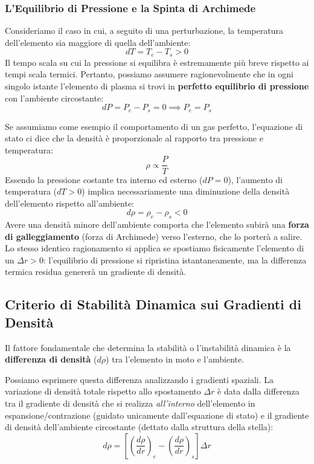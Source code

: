 \subsubsection{L'Equilibrio di Pressione e la Spinta di Archimede}
Consideriamo il caso in cui, a seguito di una perturbazione, la temperatura dell'elemento sia maggiore di quella dell'ambiente:
\begin{equation}
dT = T_e - T_s > 0
\end{equation}
Il tempo scala su cui la pressione si equilibra è estremamente più breve rispetto ai tempi scala termici. Pertanto, possiamo assumere ragionevolmente che in ogni singolo istante l'elemento di plasma si trovi in \textbf{perfetto equilibrio di pressione} con l'ambiente circostante:
\begin{equation}
dP = P_e - P_s = 0 \implies P_e = P_s
\end{equation}

Se assumiamo come esempio il comportamento di un gas perfetto, l'equazione di stato ci dice che la densità è proporzionale al rapporto tra pressione e temperatura:
\begin{equation}
\rho \propto \frac{P}{T}
\end{equation}
Essendo la pressione costante tra interno ed esterno ($dP = 0$), l'aumento di temperatura ($dT > 0$) implica necessariamente una diminuzione della densità dell'elemento rispetto all'ambiente:
\begin{equation}
d\rho = \rho_e - \rho_s < 0
\end{equation}
Avere una densità minore dell'ambiente comporta che l'elemento subirà una \textbf{forza di galleggiamento} (forza di Archimede) verso l'esterno, che lo porterà a salire. Lo stesso identico ragionamento si applica se spostiamo fisicamente l'elemento di un $\Delta r > 0$: l'equilibrio di pressione si ripristina istantaneamente, ma la differenza termica residua genererà un gradiente di densità.

\subsection{Criterio di Stabilità Dinamica sui Gradienti di Densità}

Il fattore fondamentale che determina la stabilità o l'instabilità dinamica è la \textbf{differenza di densità} ($d\rho$) tra l'elemento in moto e l'ambiente.

Possiamo esprimere questa differenza analizzando i gradienti spaziali. La variazione di densità totale rispetto allo spostamento $\Delta r$ è data dalla differenza tra il gradiente di densità che si realizza \textit{all'interno} dell'elemento in espansione/contrazione (guidato unicamente dall'equazione di stato) e il gradiente di densità dell'ambiente circostante (dettato dalla struttura della stella):
\begin{equation}
d\rho = \left[ \left( \frac{d\rho}{dr} \right)_e - \left( \frac{d\rho}{dr} \right)_s \right] \Delta r
\end{equation}

